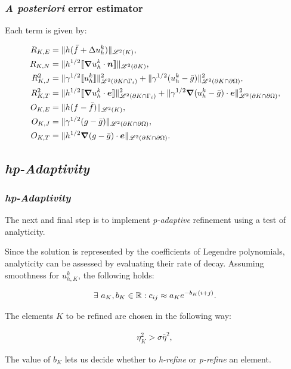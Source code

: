 \begin{frame}
    \frametitle{\textit{A posteriori} error estimator}

    Each term is given by:

    \begin{align}
        R_{K, E} &= \lVert h (\bar{f} + \Delta u^k_h) \rVert_{\mathscr{L}^2(K)},\notag \\
        R_{K, N} &= \lVert h^{1/2} \llbracket \bm{\nabla} u^k_h \cdot \bm{n} \rrbracket \rVert_{\mathscr{L}^2(\partial K)},\notag \\
        R^2_{K, J} &= \lVert \gamma^{1/2} \llbracket u^k_h \rrbracket \rVert^2_{\mathscr{L}^2(\partial K \cap \Gamma_{i})} + \lVert \gamma^{1/2} (u^k_h - \bar{g}) \rVert^2_{\mathscr{L}^2(\partial K \cap \partial \Omega)},\notag \\
        R^2_{K, T} &= \lVert h^{1/2} \llbracket \bm{\nabla} u^k_h \cdot \bm{e} \rrbracket \rVert^2_{\mathscr{L}^2(\partial K \cap \Gamma_{i})} + \lVert \gamma^{1/2} \bm{\nabla} (u^k_h - \bar{g}) \cdot \bm{e} \rVert^2_{\mathscr{L}^2(\partial K \cap \partial \Omega)},\notag \\
        O_{K, E} &= \lVert h (f - \bar{f}) \rVert_{\mathscr{L}^2(K)},\notag \\
        O_{K, J} &= \lVert \gamma^{1/2} (g - \bar{g}) \rVert_{\mathscr{L}^2(\partial K \cap \partial \Omega)},\notag \\
        O_{K, T} &= \lVert h^{1/2} \bm{\nabla} (g - \bar{g}) \cdot \bm{e} \rVert_{\mathscr{L}^2(\partial K \cap \partial \Omega)}. \notag
    \end{align}

\end{frame}

\subsection{\textit{hp-Adaptivity}}

\begin{frame}
    \frametitle{\textit{hp-Adaptivity}}

    The next and final step is to implement \textit{p-adaptive} refinement using a test of analyticity.

    Since the solution is represented by the coefficients of Legendre polynomials, analyticity can be assessed by evaluating their rate of decay. Assuming smoothness for $u^k_{h, K}$, the following holds:

    \begin{gather}
        \exists ~ a_K, b_K \in \mathbb{R} : c_{ij} \approx a_K e^{-b_K (i + j)}.
    \end{gather}

    The elements $K$ to be refined are chosen in the following way:

    \begin{gather}
        \eta_K^2 > \sigma \bar{\eta}^2,
    \end{gather}

    The value of $b_K$ lets us decide whether to \textit{h-refine} or \textit{p-refine} an element.

\end{frame}